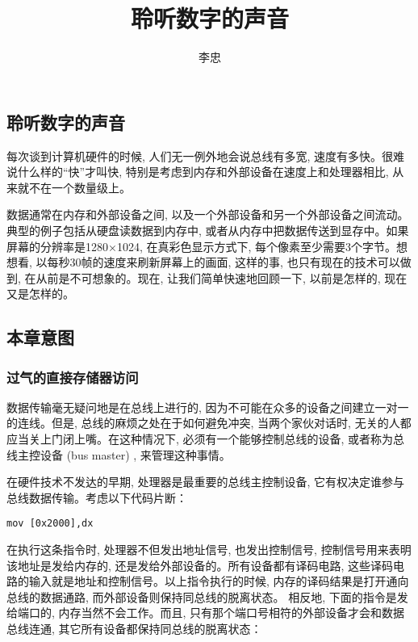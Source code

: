\documentclass[12pt]{article}
\begin{document}
\begin{CJK}{UTF8}{gbsn} %

\title{聆听数字的声音}
\author{李忠}

\maketitle

\newpage
\tableofcontents
\newpage

\section{聆听数字的声音}
每次谈到计算机硬件的时候, 人们无一例外地会说总线有多宽, 速度有多快。很难说什么样的“快”才叫快, 特别是考虑到内存和外部设备在速度上和处理器相比, 从来就不在一个数量级上。

数据通常在内存和外部设备之间, 以及一个外部设备和另一个外部设备之间流动。典型的例子包括从硬盘读数据到内存中, 或者从内存中把数据传送到显存中。如果屏幕的分辨率是1280×1024, 在真彩色显示方式下, 每个像素至少需要3个字节。想想看, 以每秒30帧的速度来刷新屏幕上的画面, 这样的事, 也只有现在的技术可以做到, 在从前是不可想象的。现在, 让我们简单快速地回顾一下, 以前是怎样的, 现在又是怎样的。

\subsection{本章意图}
\subsubsection{过气的直接存储器访问}
数据传输毫无疑问地是在总线上进行的, 因为不可能在众多的设备之间建立一对一的连线。但是, 总线的麻烦之处在于如何避免冲突, 当两个家伙对话时, 无关的人都应当关上门闭上嘴。在这种情况下, 必须有一个能够控制总线的设备, 或者称为总线主控设备 (bus master) , 来管理这种事情。

在硬件技术不发达的早期, 处理器是最重要的总线主控制设备, 它有权决定谁参与总线数据传输。考虑以下代码片断：

\begin{verbatim}
mov [0x2000],dx
\end{verbatim}

在执行这条指令时, 处理器不但发出地址信号, 也发出控制信号, 控制信号用来表明该地址是发给内存的, 还是发给外部设备的。所有设备都有译码电路, 这些译码电路的输入就是地址和控制信号。以上指令执行的时候, 内存的译码结果是打开通向总线的数据通路, 而外部设备则保持同总线的脱离状态。
相反地, 下面的指令是发给端口的, 内存当然不会工作。而且, 只有那个端口号相符的外部设备才会和数据总线连通, 其它所有设备都保持同总线的脱离状态：


\end{CJK}
\end{document}
